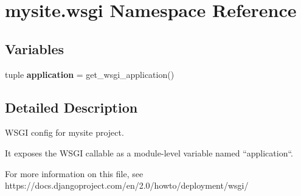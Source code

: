 \hypertarget{namespacemysite_1_1wsgi}{\section{mysite.\-wsgi Namespace Reference}
\label{namespacemysite_1_1wsgi}
}
\subsection*{Variables}
\begin{DoxyCompactItemize}
\item 
\hypertarget{namespacemysite_1_1wsgi_a9cd696e1f8eae26f7d3df6bb3adb09ee}{tuple {\bfseries application} = get\-\_\-wsgi\-\_\-application()}\label{namespacemysite_1_1wsgi_a9cd696e1f8eae26f7d3df6bb3adb09ee}

\end{DoxyCompactItemize}


\subsection{Detailed Description}
\begin{DoxyVerb}WSGI config for mysite project.

It exposes the WSGI callable as a module-level variable named ``application``.

For more information on this file, see
https://docs.djangoproject.com/en/2.0/howto/deployment/wsgi/
\end{DoxyVerb}
 